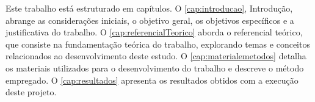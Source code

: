 Este trabalho está estruturado em capítulos. O \autoref{cap:introducao}, Introdução, abrange as considerações iniciais, o objetivo geral, os objetivos específicos e a justificativa do trabalho. O \autoref{cap:referencialTeorico} aborda o referencial teórico, que consiste na fundamentação teórica do trabalho, explorando temas e conceitos relacionados ao desenvolvimento deste estudo. O \autoref{cap:materialemetodos} detalha os materiais utilizados para o desenvolvimento do trabalho e descreve o método empregado. O \autoref{cap:resultados} apresenta os resultados obtidos com a execução deste projeto. 
